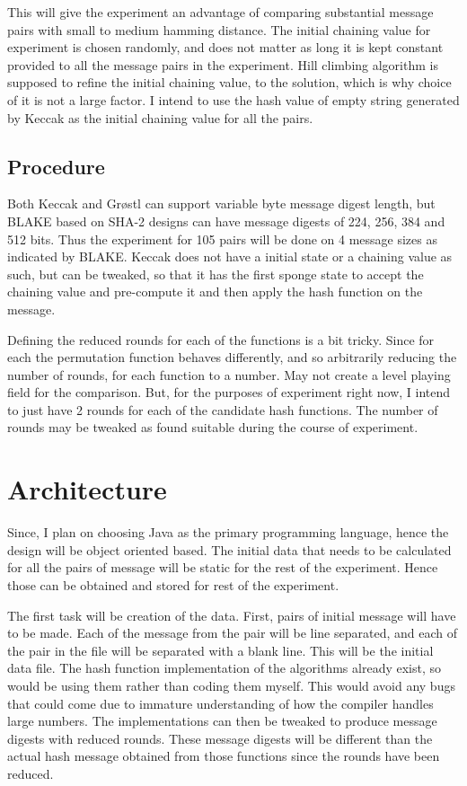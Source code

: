   This will give the experiment an advantage of comparing substantial message pairs with small to medium hamming distance.
  The initial chaining value for experiment is chosen randomly, and does not matter as long it is kept constant provided
  to all the message pairs in the experiment. Hill climbing algorithm is supposed to refine the initial chaining value,
  to the solution, which is why choice of it is not a large factor. I intend to use the hash value of empty string generated
  by Keccak as the initial chaining value for all the pairs.

  \subsection{Procedure}

  Both Keccak and Gr{\o}stl can support variable byte message digest length, but BLAKE based on SHA-2 designs can have
  message digests of 224, 256, 384 and 512 bits. Thus the experiment for 105 pairs will be done on 4 message sizes as
  indicated by BLAKE. Keccak does not have a initial state or a chaining value as such, but can be tweaked, so that it
  has the first sponge state to accept the chaining value and pre-compute it and then apply the hash function on the
  message.

  Defining the reduced rounds for each of the functions is a bit tricky. Since for each the permutation function behaves
  differently, and so arbitrarily reducing the number of rounds, for each function to a number. May not create a level
  playing field for the comparison. But, for the purposes of experiment right now, I intend to just have 2 rounds for 
  each of the candidate hash functions. The number of rounds may be tweaked as found suitable during the course of 
  experiment.

\section{Architecture}

Since, I plan on choosing Java as the primary programming language, hence the design will be 
object oriented based. The initial data that needs to be calculated for all the pairs of message
will be static for the rest of the experiment. Hence those can be obtained and stored for rest
of the experiment.

The first task will be creation of the data. First, pairs of initial message will have to be 
made. Each of the message from the pair will be line separated, and each of the pair in the file
will be separated with a blank line. This will be the initial data file. The hash function 
implementation of the algorithms already exist, so would be using them rather than coding them 
myself. This would avoid any bugs that could come due to immature understanding of how the compiler
handles large numbers. The implementations can then be tweaked to produce message digests with 
reduced rounds. These message digests will be different than the actual hash message obtained from
those functions since the rounds have been reduced.

